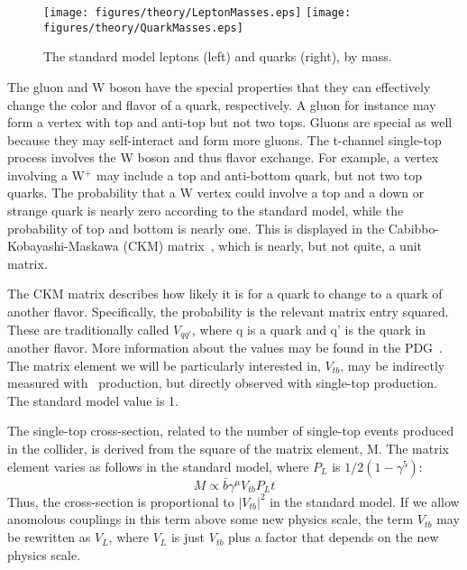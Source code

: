 \begin{figure}[!htpb]
  \centering
    \texttt{[image: figures/theory/LeptonMasses.eps]}
    \texttt{[image: figures/theory/QuarkMasses.eps]}
    \label{fig:QuarkMass} 
\caption{The standard model leptons (left) and quarks (right), by mass.}
\end{figure}

The gluon and W boson have the special properties that they can effectively change the color and flavor of a quark, respectively.  A gluon for instance may form a vertex with top and anti-top but not two tops.  Gluons are special as well because they may self-interact and form more gluons.  The t-channel single-top process involves the W boson and thus flavor exchange.  For example, a vertex involving a W$^{+}$ may include a top and anti-bottom quark, but not two top quarks.  The probability that a W vertex could involve a top and a down or strange quark is nearly zero according to the standard model, while the probability of top and bottom is nearly one.  This is displayed in the Cabibbo-Kobayashi-Maskawa (CKM) matrix~\cite{CKM1, CKM2}, which is nearly, but not quite, a unit matrix.  

The CKM matrix describes how likely it is for a quark to change to a quark of another flavor.  Specifically, the probability is the relevant matrix entry squared.  These are traditionally called $V_{qq'}$, where q is a quark and q' is the quark in another flavor.  More information about the values may be found in the PDG~\cite{PDGSummary}.  The matrix element we will be particularly interested in, $V_{tb}$, may be indirectly measured with \ttbar~production, but directly observed with single-top production.  The standard model value is 1.

The single-top cross-section, related to the number of single-top events produced in the collider, is derived from the square of the matrix element, M.  The matrix element varies as follows in the standard model, where $P_L$ is $1/2(1-\gamma^5)$:
\begin{equation} M \propto \bar{b}\gamma^{\mu}V_{tb} P_L t\end{equation}
Thus, the cross-section is proportional to $|V_{tb}|^2$ in the standard model.  If we allow anomolous couplings in this term above some new physics scale, the term $V_{tb}$ may be rewritten as $V_{L}$, where $V_{L}$ is just $V_{tb}$ plus a factor that depends on the new physics scale.  

